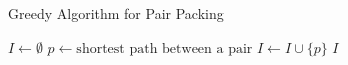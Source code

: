 \begin{frame}{Greedy Algorithm for Pair Packing}


\begin{algorithm}[H]
\begin{algorithmic}[1]

\STATE $I \gets \emptyset$
\STATE $p \gets \text{shortest path between a pair}$
\STATE $I \gets I \cup \{p\}$
\ENDWHILE
\RETURN $I$


\end{algorithmic}
\caption{Greedy Algorithm}
\end{algorithm}


\end{frame}